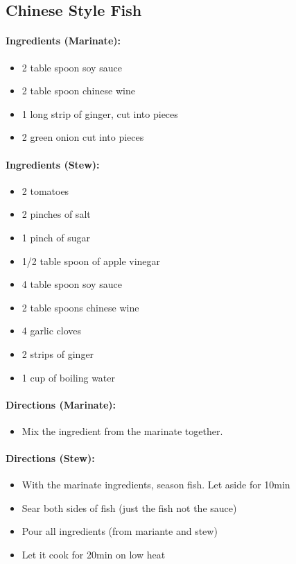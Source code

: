 \documentclass{article}
\begin{document}
\subsection{Chinese Style Fish} 

\paragraph{Ingredients (Marinate):}
\begin{itemize}
    \item 2 table spoon soy sauce
    \item 2 table spoon chinese wine
    \item 1 long strip of ginger, cut into pieces
    \item 2 green onion cut into pieces
\end{itemize}  

\paragraph{Ingredients (Stew):}
\begin{itemize}
    \item 2 tomatoes
    \item 2 pinches of salt
    \item 1 pinch of sugar
    \item 1/2 table spoon of apple vinegar
    \item 4 table spoon soy sauce
    \item 2 table spoons chinese wine
    \item 4 garlic cloves
    \item 2 strips of ginger
    \item 1 cup of boiling water
\end{itemize}  

\paragraph{Directions (Marinate):}
\begin{itemize}
    \item Mix the ingredient from the marinate together.
\end{itemize}  

\paragraph{Directions (Stew):}
\begin{itemize}
    \item With the marinate ingredients, season fish. Let aside for 10min
    \item Sear both sides of fish (just the fish not the sauce)
    \item Pour all ingredients (from mariante and stew)
    \item Let it cook for 20min on low heat
\end{itemize} 
\end{document}
